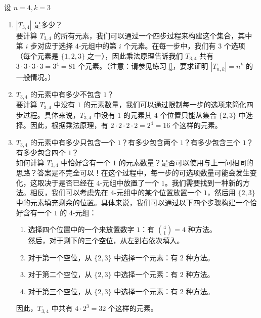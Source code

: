 \begin{example}
    设 $n=4, k=3$

    \begin{enumerate}[label=(\arabic*)]
        \item $|T_{3,4}|$ 是多少？\\
              要计算 $T_{3,4}$ 的所有元素，我们可以通过一个四步过程来构建这个集合，其中第 $i$ 步对应于选择 $4$-元组中的第 $i$ 个元素。在每一步中，我们有 $3$ 个选项（每个元素是 $\{1, 2, 3\}$ 之一），因此乘法原理告诉我们 $T_{3,4}$ 共有 $3 \cdot 3 \cdot 3 \cdot 3 = 3^4 = 81$ 个元素。（注意：请参见练习 \ref{}，要求证明 $|T_{n,k}| = n^k$ 的一般情况。）
        \item $T_{3,4}$ 的元素中有多少不包含 $1$？\\
              要计算 $T_{3,4}$ 中没有 $1$ 的元素数量，我们可以通过限制每一步的选项来简化四步过程。具体来说，$T_{3,4}$ 中没有 $1$ 的元素其 $4$ 个位置只能从集合 $\{2, 3\}$ 中选择。因此，根据乘法原理，有 $2 \cdot 2 \cdot 2 \cdot 2 = 2^4 = 16$ 个这样的元素。
        \item $T_{3,4}$ 的元素中有多少只包含一个 $1$？有多少包含两个 $1$？有多少包含三个 $1$？有多少包含四个 $1$？\\
              如何计算 $T_{3,4}$ 中恰好含有一个 $1$ 的元素数量？是否可以使用与上一问相同的思路？答案是不完全可以！在这个过程中，每一步的可选项数量可能会发生变化，这取决于是否已经在 $4$-元组中放置了一个 $1$。我们需要找到一种新的方法。相反，我们可以考虑先在 $4$-元组中的某个位置放置一个 $1$，然后用 $\{2, 3\}$ 中的元素填充剩余的位置。具体来说，我们可以通过以下四个步骤构建一个恰好含有一个 $1$ 的 $4$-元组：
              \begin{enumerate}[label=(\alph*)]
                  \item 选择四个位置中的一个来放置数字 $1$：有 ${4 \choose 1}=4$ 种方法。\\
                        然后，对于剩下的三个空位，从左到右依次填入。
                  \item 对于第一个空位，从 $\{2, 3\}$ 中选择一个元素：有 $2$ 种方法。
                  \item 对于第二个空位，从 $\{2, 3\}$ 中选择一个元素：有 $2$ 种方法。
                  \item 对于第三个空位，从 $\{2, 3\}$ 中选择一个元素：有 $2$ 种方法。
              \end{enumerate}
              因此，$T_{3,4}$ 中共有 $4 \cdot 2^3 = 32$ 个这样的元素。
    \end{enumerate}


\end{example}
